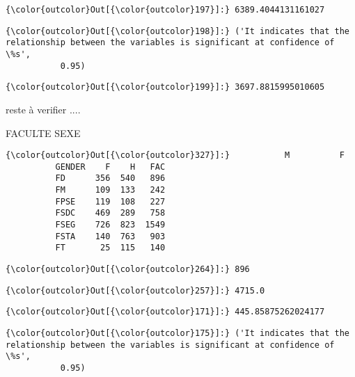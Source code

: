 \documentclass[11pt]{article}
\begin{document}
            \begin{Verbatim}[commandchars=\\\{\}]
{\color{outcolor}Out[{\color{outcolor}197}]:} 6389.4044131161027
\end{Verbatim}
        
            \begin{Verbatim}[commandchars=\\\{\}]
{\color{outcolor}Out[{\color{outcolor}198}]:} ('It indicates that the relationship between the variables is significant at confidence of \%s',
           0.95)
\end{Verbatim}
        
            \begin{Verbatim}[commandchars=\\\{\}]
{\color{outcolor}Out[{\color{outcolor}199}]:} 3697.8815995010605
\end{Verbatim}
        
    reste à verifier ....

    FACULTE SEXE

            \begin{Verbatim}[commandchars=\\\{\}]
{\color{outcolor}Out[{\color{outcolor}327}]:}           M          F
          GENDER    F    H   FAC
          FD      356  540   896
          FM      109  133   242
          FPSE    119  108   227
          FSDC    469  289   758
          FSEG    726  823  1549
          FSTA    140  763   903
          FT       25  115   140
\end{Verbatim}
        
            \begin{Verbatim}[commandchars=\\\{\}]
{\color{outcolor}Out[{\color{outcolor}264}]:} 896
\end{Verbatim}
        
            \begin{Verbatim}[commandchars=\\\{\}]
{\color{outcolor}Out[{\color{outcolor}257}]:} 4715.0
\end{Verbatim}
        
            \begin{Verbatim}[commandchars=\\\{\}]
{\color{outcolor}Out[{\color{outcolor}171}]:} 445.85875262024177
\end{Verbatim}
        
            \begin{Verbatim}[commandchars=\\\{\}]
{\color{outcolor}Out[{\color{outcolor}175}]:} ('It indicates that the relationship between the variables is significant at confidence of \%s',
           0.95)
\end{Verbatim}
        
\end{document}
